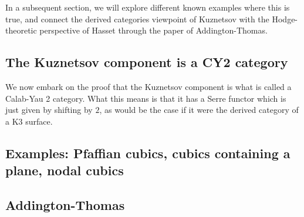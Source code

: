 In a subsequent section, we will explore different known examples where this is true, and connect the derived categories viewpoint of Kuznetsov with the Hodge-theoretic perspective of Hasset through the paper of Addington-Thomas.

\subsection{The Kuznetsov component is a CY2 category}

We now embark on the proof that the Kuznetsov component is what is called a Calab-Yau 2 category. What this means is that it has a Serre functor which is just given by shifting by $2$, as would be the case if it were the derived category of a K3 surface.



\subsection{Examples: Pfaffian cubics, cubics containing a plane, nodal cubics}

\subsection{Addington-Thomas}









